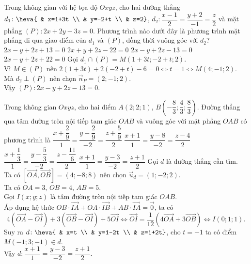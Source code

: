 \begin{ex}%
Trong không gian với hệ tọa độ $Oxyz$, cho hai đường thẳng $d_1\colon \heva{ & x=1+3t \\ & y=-2+t \\ & z=2}$, $d_2\colon \dfrac{x-1}{2}=\dfrac{y+2}{-1}=\dfrac{z}{2}$ và mặt phẳng $(P)\colon 2x+2y-3z=0$. Phương trình nào dưới đây là phương trình mặt phẳng đi qua giao điểm của $d_1$ và $(P)$, đồng thời vuông góc với $d_2$?
\choice
{$2x-y+2z+13=0$}
{$2x+y+2z-22=0$}
{\True $2x-y+2z-13=0$}
{$2x-y+2z+22=0$}
\loigiai
{
Gọi $d_1\cap (P)=M(1+3t;-2+t;2)$.\\
Vì $M\in (P)$ nên $2(1+3t)+2(-2+t)-6=0\Leftrightarrow t=1 \Leftrightarrow M(4;-1;2)$.\\
Mà $d_2\perp (P)$ nên chọn $\overrightarrow{n}_{P}=(2;-1;2)$.\\
Vậy $(P)\colon 2x-y+2z-13=0$.
}
\end{ex}

\begin{ex}%
Trong không gian $Oxyz$, cho hai điểm $A(2;2;1)$, $B\left(-\dfrac{8}{3};\dfrac{4}{3};\dfrac{8}{3}\right)$. Đường thẳng qua tâm đường tròn nội tiếp tam giác $OAB$ và vuông góc với mặt phẳng $OAB$ có phương trình là
\choice
{$\dfrac{x+\dfrac{2}{9}}{1}=\dfrac{y-\dfrac{2}{9}}{-2}=\dfrac{z+\dfrac{5}{9}}{2}$}
{$\dfrac{x+1}{1}=\dfrac{y-8}{-2}=\dfrac{z-4}{2}$}
{$\dfrac{x+\dfrac{1}{3}}{1}=\dfrac{y-\dfrac{5}{3}}{-2}=\dfrac{z-\dfrac{11}{6}}{2}$}
{\True $\dfrac{x+1}{1}=\dfrac{y-3}{-2}=\dfrac{z+1}{2}$}
\loigiai
{
Gọi $d$ là đường thẳng cần tìm.\\
Ta có $\left[\overrightarrow{OA},\overrightarrow{OB}\right]=(4;-8;8)$ nên chọn $\overrightarrow{u}_{d}=(1;-2;2)$.\\
Ta có $OA=3$, $OB=4$, $AB=5$.\\
Gọi $I(x;y;z)$ là tâm đường tròn nội tiếp tam giác $OAB$.\\
Áp dụng hệ thức $OB\cdot\overrightarrow{IA}+OA\cdot\overrightarrow{IB}+AB\cdot\overrightarrow{IA}=\overrightarrow{0}$, ta có
$$4\left(\overrightarrow{OA}-\overrightarrow{OI}\right)+3\left(\overrightarrow{OB}-\overrightarrow{OI}\right)+5\overrightarrow{OI}\Leftrightarrow \overrightarrow{OI}=\dfrac{1}{12}\left(4\overrightarrow{OA}+3\overrightarrow{OB}\right)\Leftrightarrow I(0;1;1).$$
Suy ra $d\colon \heva{ & x=t \\ & y=1-2t \\ & z=1+2t}$, cho $t=-1$ ta có điểm $M(-1;3;-1)\in d$.\\
Vậy $d\colon \dfrac{x+1}{1}=\dfrac{y-3}{-2}=\dfrac{z+1}{2}$.
}
\end{ex}


